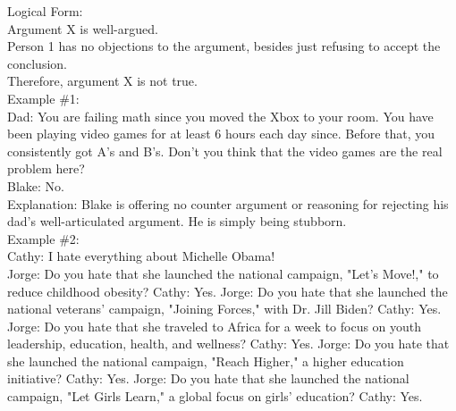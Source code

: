 \documentclass[a4paper,12pt,single,pdftex]{scrartcl}
\begin{document}
    
      Logical Form:
    \\

    
      Argument X is well-argued.
    \\

    
      Person 1 has no objections to the argument, besides just refusing to accept the conclusion.
    \\

    
      Therefore, argument X is not true.
    \\

    
      Example \#1:
    \\

    
      Dad: You are failing math since you moved the Xbox to your room. You have been playing video games for at least 6 hours each day since. Before that, you consistently got A's and B's. Don't you think that the video games are the real problem here?
    \\

    
      Blake: No.
    \\

    
      Explanation: Blake is offering no counter argument or reasoning for rejecting his dad's well-articulated argument. He is simply being stubborn.
    \\

    
      Example \#2:
    \\

    
      Cathy: I hate everything about Michelle Obama!
    \\

    
      Jorge: Do you hate that she launched the national campaign, "Let's Move!," to reduce childhood obesity? \newline
Cathy: Yes. \newline
Jorge: Do you hate that she launched the national veterans' campaign, "Joining Forces," with Dr. Jill Biden? \newline
Cathy: Yes. \newline
Jorge: Do you hate that she traveled to Africa for a week to focus on youth leadership, education, health, and wellness? \newline
Cathy: Yes. \newline
Jorge: Do you hate that she launched the national campaign, "Reach Higher," a higher education initiative? \newline
Cathy: Yes. \newline
Jorge: Do you hate that she launched the national campaign, "Let Girls Learn," a global focus on girls' education? \newline
Cathy: Yes.
    \\
\end{document}
